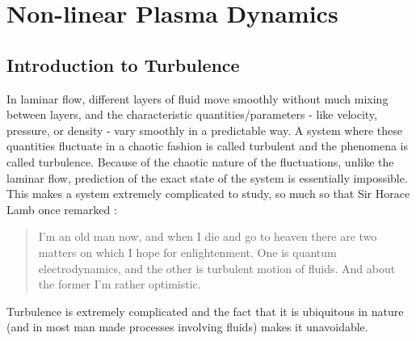 %
%
\chapter{Non-linear Plasma Dynamics}\label{chap:chap3}

    \section{Introduction to Turbulence}\label{sec:intr3}

        In laminar flow, different layers of fluid move smoothly without much mixing between layers,
        and the characteristic quantities/parameters - like velocity, pressure, or density - vary
        smoothly in a predictable way. A system where these quantities fluctuate in a chaotic
        fashion is called turbulent and the phenomena is called turbulence. Because of the chaotic
        nature of the fluctuations, unlike the laminar flow, prediction of the exact state of the
        system is essentially impossible. This makes a system extremely complicated to study, so
        much so that Sir Horace Lamb once remarked \citep{Goldstein1969}:

        \begin{quote}
             I'm an old man now, and when I die and go to heaven there are two matters on which I
             hope for enlightenment. One is quantum electrodynamics, and the other is turbulent
             motion of fluids. And about the former I'm rather optimistic.
        \end{quote}

        Turbulence is extremely complicated and the fact that it is ubiquitous in nature (and in
        most man made processes involving fluids) makes it
        unavoidable.%

